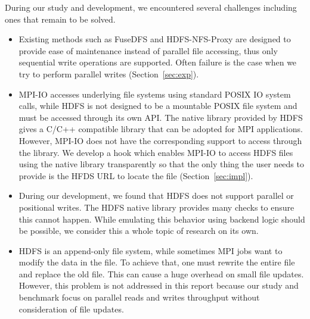 During our study and development, we encountered several
challenges including ones that remain to be solved.
\begin{itemize}
\item Existing methods such as FuseDFS and HDFS-NFS-Proxy are designed to provide ease of
	maintenance instead of parallel file accessing, thus only sequential
	write operations are supported. Often failure is the case when we try to
	perform parallel writes (Section~\ref{sec:exp}). 
\item MPI-IO accesses underlying file systems using standard POSIX IO system
	calls, while HDFS is not designed to be a mountable POSIX file system
	and must be accessed through its own API. The native library provided by
	HDFS gives a C/C++ compatible library that can be adopted for MPI
	applications.
	However, MPI-IO does not have the corresponding support to access
	through the library. We develop a hook which enables MPI-IO to access
	HDFS files using the native library transparently so that the only thing
	the user needs to provide is the HFDS URL to locate the file
	(Section~\ref{sec:impl}).
\item During our development, we found that HDFS does not support 
	parallel or positional writes. The HDFS native library provides many
	checks to ensure this cannot happen. While emulating this behavior
	using backend logic should be possible, we consider this a whole topic of
	research on its own.
\item HDFS is an append-only file system, while sometimes MPI jobs want to
	modify the data in the file. To achieve that, one must rewrite the
	entire file and replace the old file. This can cause a huge overhead on
	small file updates. However, this problem is not addressed in this
	report because our study and benchmark focus on parallel reads and
	writes throughput without consideration of file updates.
\end{itemize}

